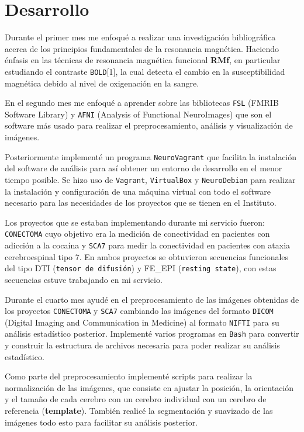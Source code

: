 \documentclass{article}
\begin{document}
\section{Desarrollo}
Durante el primer mes me enfoqué a realizar una investigación bibliográfica acerca de los principios fundamentales de la resonancia magnética. Haciendo énfasis en las técnicas de resonancia magnética funcional \textbf{RMf}, en particular estudiando el contraste \texttt{BOLD}[1], la cual detecta el cambio en la susceptibilidad magnética debido al nivel de oxigenación en la sangre.

En el segundo mes me enfoqué a aprender sobre las bibliotecas \texttt{FSL} (FMRIB Software Library) y \texttt{AFNI} (Analysis of Functional NeuroImages) que son el software más usado para realizar el preprocesamiento, análisis y visualización de imágenes.

Posteriormente implementé un programa \texttt{NeuroVagrant} que facilita la instalación del software de análisis para así obtener un entorno de desarrollo en el menor tiempo posible. Se hizo uso de \texttt{Vagrant}, \texttt{VirtualBox} y \texttt{NeuroDebian} para realizar la instalación y configuración de una máquina virtual con todo el software necesario para las necesidades de los proyectos que se tienen en el Instituto.

Los proyectos que se estaban implementando durante mi servicio fueron: \texttt{CONECTOMA} cuyo objetivo era la medición de conectividad en pacientes con adicción a la cocaína y \texttt{SCA7} para medir la conectividad en pacientes con ataxia cerebroespinal tipo 7. En ambos proyectos se obtuvieron secuencias funcionales del tipo DTI (\texttt{tensor de difusión}) y FE\_EPI (\texttt{resting state}), con estas secuencias estuve trabajando en mi servicio.

Durante el cuarto mes ayudé en el preprocesamiento de las imágenes obtenidas de los proyectos \texttt{CONECTOMA} y \texttt{SCA7} cambiando las imágenes del formato \texttt{DICOM} (Digital Imaging and Communication in Medicine) al formato \texttt{NIFTI} para su análisis estadístico posterior. Implementé varios programas en \texttt{Bash} para convertir y construir la estructura de archivos necesaria para poder realizar su análisis estadístico.

Como parte del preprocesamiento implementé scripts para realizar la normalización de las imágenes, que consiste en ajustar la posición, la orientación y el tamaño de cada cerebro con un cerebro individual con un cerebro de referencia (\textbf{template}). También realicé la segmentación y suavizado de las imágenes todo esto para facilitar su análisis posterior. 
\end{document}
